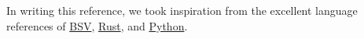 In writing this reference, we took inspiration from the excellent language references
of \href{http://csg.csail.mit.edu/6.S078/6_S078_2012_www/resources/reference-guide.pdf}{BSV},
\href{https://doc.rust-lang.org/stable/reference/}{Rust},
and \href{https://docs.python.org/3/reference/}{Python}.

